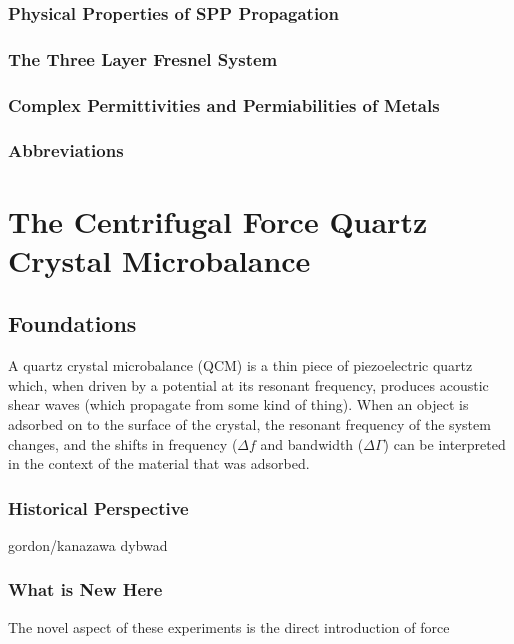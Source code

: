 \documentclass[a4paper,titlepage,onecolumn]{report}
\newcommand{\df}{\Delta\!f}
\newcommand{\dg}{\Delta\Gamma}
\begin{document}
\section{Physical Properties of SPP Propagation}
\label{ref:physicalproperties}
\section{The Three Layer Fresnel System}

\section{Complex Permittivities and Permiabilities of Metals}


\section{Abbreviations}

\part{The Centrifugal Force Quartz Crystal Microbalance}
\chapter{Foundations}
A quartz crystal microbalance (QCM) is a thin piece of piezoelectric
quartz which, when driven by a potential at its resonant frequency,
produces acoustic shear waves (which propagate from some kind of thing).
When an object is adsorbed on to the surface of the crystal, the resonant
frequency of the system changes, and the shifts in frequency ($\df$ and
bandwidth ($\dg$) can be interpreted in the context of the material that
was adsorbed.

\section{Historical Perspective}
gordon/kanazawa
dybwad

\section{What is New Here}
The novel aspect of these experiments is the direct introduction of force 
\end{document}
